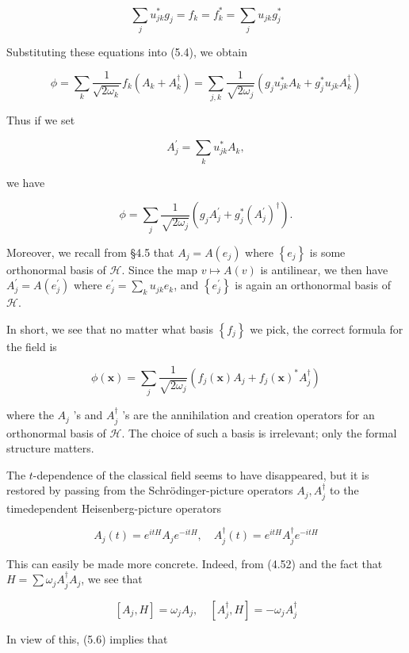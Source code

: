 \documentclass[10pt, letterpaper]{article}
\begin{document}
$$
\sum_{j} u_{j k}^{*} g_{j}=f_{k}=f_{k}^{*}=\sum_{j} u_{j k} g_{j}^{*}
$$

Substituting these equations into (5.4), we obtain

$$
\phi=\sum_{k} \frac{1}{\sqrt{2 \omega_{k}}} f_{k}\left(A_{k}+A_{k}^{\dagger}\right)=\sum_{j, k} \frac{1}{\sqrt{2 \omega_{j}}}\left(g_{j} u_{j k}^{*} A_{k}+g_{j}^{*} u_{j k} A_{k}^{\dagger}\right)
$$

Thus if we set

$$
A_{j}^{\prime}=\sum_{k} u_{j k}^{*} A_{k},
$$

we have

$$
\phi=\sum_{j} \frac{1}{\sqrt{2 \omega_{j}}}\left(g_{j} A_{j}^{\prime}+g_{j}^{*}\left(A_{j}^{\prime}\right)^{\dagger}\right) .
$$

Moreover, we recall from §4.5 that $A_{j}=A\left(e_{j}\right)$ where $\left\{e_{j}\right\}$ is some orthonormal basis of $\mathcal{H}$. Since the map $v \mapsto A(v)$ is antilinear, we then have $A_{j}^{\prime}=A\left(e_{j}^{\prime}\right)$ where $e_{j}^{\prime}=\sum_{k} u_{j k} e_{k}$, and $\left\{e_{j}^{\prime}\right\}$ is again an orthonormal basis of $\mathcal{H}$.

In short, we see that no matter what basis $\left\{f_{j}\right\}$ we pick, the correct formula for the field is

$$
\phi(\mathbf{x})=\sum_{j} \frac{1}{\sqrt{2 \omega_{j}}}\left(f_{j}(\mathbf{x}) A_{j}+f_{j}(\mathbf{x})^{*} A_{j}^{\dagger}\right)
$$

where the $A_{j}$ 's and $A_{j}^{\dagger}$ 's are the annihilation and creation operators for an orthonormal basis of $\mathcal{H}$. The choice of such a basis is irrelevant; only the formal structure matters.

The $t$-dependence of the classical field seems to have disappeared, but it is restored by passing from the Schrödinger-picture operators $A_{j}, A_{j}^{\dagger}$ to the timedependent Heisenberg-picture operators

$$
A_{j}(t)=e^{i t H} A_{j} e^{-i t H}, \quad A_{j}^{\dagger}(t)=e^{i t H} A_{j}^{\dagger} e^{-i t H}
$$

This can easily be made more concrete. Indeed, from (4.52) and the fact that $H=\sum \omega_{j} A_{j}^{\dagger} A_{j}$, we see that

$$
\left[A_{j}, H\right]=\omega_{j} A_{j}, \quad\left[A_{j}^{\dagger}, H\right]=-\omega_{j} A_{j}^{\dagger}
$$

In view of this, (5.6) implies that
\end{document}
